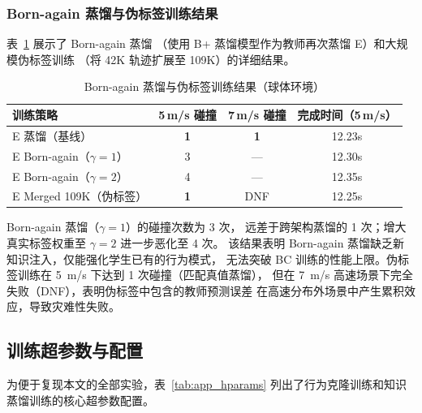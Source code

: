 \documentclass[12pt,a4paper]{article}
\numberwithin{equation}{section}
\numberwithin{figure}{section}
\numberwithin{table}{section}
\begin{document}
\subsubsection{Born-again 蒸馏与伪标签训练结果}

表~\ref{tab:app_born} 展示了 Born-again 蒸馏
（使用 B+ 蒸馏模型作为教师再次蒸馏 E）和大规模伪标签训练
（将 42K 轨迹扩展至 109K）的详细结果。

\begin{table}[H]
\centering
\caption{Born-again 蒸馏与伪标签训练结果（球体环境）}
\label{tab:app_born}
\begin{tabular}{lccc}
\toprule
\textbf{训练策略} & 5\,m/s 碰撞 & 7\,m/s 碰撞 & 完成时间（5\,m/s） \\
\midrule
E 蒸馏（基线） & \textbf{1} & \textbf{1} & 12.23s \\
E Born-again（$\gamma=1$） & 3 & --- & 12.30s \\
E Born-again（$\gamma=2$） & 4 & --- & 12.35s \\
E Merged 109K（伪标签） & \textbf{1} & DNF & 12.25s \\
\bottomrule
\end{tabular}
\end{table}

\noindent Born-again 蒸馏（$\gamma=1$）的碰撞次数为 3 次，
远差于跨架构蒸馏的 1 次；增大真实标签权重至 $\gamma=2$ 进一步恶化至 4 次。
该结果表明 Born-again 蒸馏缺乏新知识注入，仅能强化学生已有的行为模式，
无法突破 BC 训练的性能上限。伪标签训练在 5~m/s 下达到 1 次碰撞（匹配真值蒸馏），
但在 7~m/s 高速场景下完全失败（DNF），表明伪标签中包含的教师预测误差
在高速分布外场景中产生累积效应，导致灾难性失败。

\subsection{训练超参数与配置}
\label{app:hparams}

为便于复现本文的全部实验，表~\ref{tab:app_hparams} 列出了行为克隆训练和知识蒸馏训练的核心超参数配置。
\end{document}
